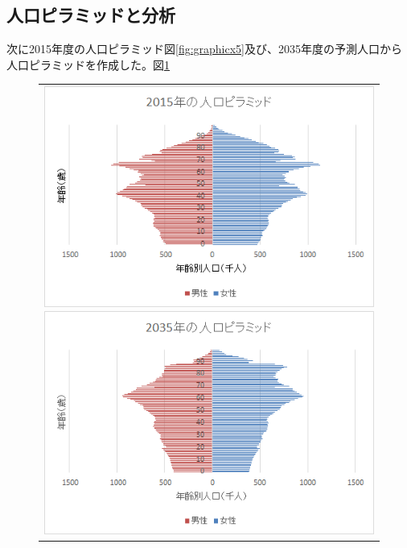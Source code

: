 \documentclass[uplatex, titlepage]{jsarticle}
\begin{document}
\subsection{人口ピラミッドと分析}

次に2015年度の人口ピラミッド図\ref{fig:graphicx5}及び、2035年度の予測人口から人口ピラミッドを作成した。図\ref{fig:graphicx6}

\begin{figure}[H]
  \centering
    \begin{tabular}{c}
      \begin{minipage}{0.5\hsize}
        \begin{center}
          \includegraphics[scale = 0.9]{fffff/f3.png}
          \caption{}
          \label{fig:graphicx5}
        \end{center}
      \end{minipage}
      \begin{minipage}{0.5\hsize}
        \begin{center}
          \includegraphics[scale = 0.9]{fffff/f4.png}
          \caption{}
          \label{fig:graphicx6}
        \end{center}
      \end{minipage}
    \end{tabular}
\end{figure}
\end{document}
